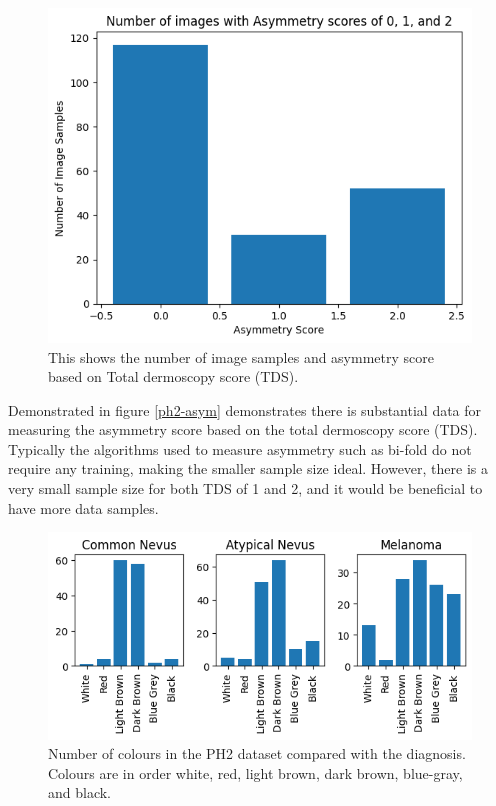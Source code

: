\begin{figure}
	\centering
	\includegraphics[scale=0.8]{images/ph2/ph2-asym-number.png}
	\caption{This shows the number of image samples and asymmetry score based on Total dermoscopy score (TDS).} 
\end{figure} \label{ph2-asym-number}

Demonstrated in figure \ref{ph2-asym} demonstrates there is substantial data for measuring the asymmetry score based on the total dermoscopy score (TDS). Typically the algorithms used to measure asymmetry such as bi-fold do not require any training, making the smaller sample size ideal. However, there is a very small sample size for both TDS of 1 and 2, and it would be beneficial to have more data samples.

\begin{figure}
	\centering
	\includegraphics[scale=0.8]{images/ph2/ph2-colour-number.png}
	\caption{Number of colours in the PH2 dataset compared with the diagnosis. Colours are in order white, red, light brown, dark brown, blue-gray, and black.} 
\end{figure} \label{ph2-colour-number}

